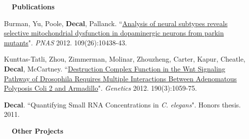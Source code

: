 \documentclass[a4paper,12pt]{article}
\newcommand{\resheading}[1]{{\vspace*{.001in} \colorbox{mygrey}{\begin{minipage}{\textwidth}{\textmd{\large \textbf{#1} \vphantom{p\^{E}}}}\end{minipage}}} }
\newcommand{\tabitem}{~~\llap{\textbullet}~~}
\begin{document}
\resheading{~~Publications}
\vspace{-1em}
{\setlength{\parskip}{8pt}

      Burman, Yu, Poole, \textbf{Decal}, Pallanck. ``\href{http://www.pnas.org/content/early/2012/06/12/1120688109}{Analysis of neural subtypes reveals selective mitochondrial dysfunction in dopaminergic neurons from parkin mutants}". \textit{PNAS} 2012. 109(26):10438-43.
      
      Kunttas-Tatli, Zhou, Zimmerman, Molinar, Zhouzheng, Carter, Kapur, Cheatle, \textbf{Decal}, McCartney. ``\href{http://www.genetics.org/content/190/3/1059.full}{Destruction Complex Function in the Wnt Signaling Pathway of Drosophila Requires Multiple Interactions Between Adenomatous Polyposis Coli 2 and Armadillo}". \textit{Genetics} 2012. 190(3):1059-75.
      
      \textbf{\textbf{Decal}}. ``Quantifying Small RNA Concentrations in \textit{C. elegans}". Honors thesis. 2011.\\
      
}
      \resheading{~~Other Projects}
      \vspace{-1.5em}
      \setlength{\extrarowheight}{.5em}  %
\end{document}
